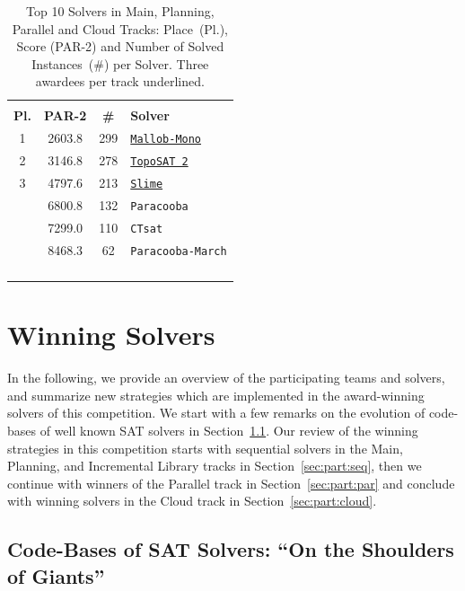 \documentclass{elsarticle}
\newcommand{\solver}[1]{\texttt{#1}}
\newcommand{\solbert}[1]{\underline{\solver{#1}}}
\begin{document}
\begin{table}
\begin{tabularx}{.5\linewidth}{cccX}
\arrayrulecolor{lightgray}
\multicolumn{4}{l}{\bf Cloud Track}\\
\bf Pl. & \bf PAR-2 & \bf \# & \bf Solver \\
\hline
 1 & 2603.8 & 299 & \solbert{Mallob-Mono} \\
 2 & 3146.8 & 278 & \solbert{TopoSAT 2} \\
 3 & 4797.6 & 213 & \solbert{Slime} \\
   & 6800.8 & 132 & \solver{Paracooba} \\
   & 7299.0 & 110 & \solver{CTsat} \\
   & 8468.3 & \phantom{0}62 & \solver{Paracooba-March} \\
\phantom{0} & \phantom{0} & \phantom{0} & \phantom{0}\\
\phantom{0} & \phantom{0} & \phantom{0} & \phantom{0}\\
\phantom{0} & \phantom{0} & \phantom{0} & \phantom{0}\\
\phantom{0} & \phantom{0} & \phantom{0} & \phantom{0}
\end{tabularx}
\caption{Top 10 Solvers in Main, Planning, Parallel and Cloud Tracks: Place~(Pl.), Score (PAR-2) and Number of Solved Instances~(\#) per Solver.
Three awardees per track underlined.}
\label{tab:results}
\end{table}


\section{Winning Solvers}
\label{sec:winners}

In the following, we provide an overview of the participating teams and solvers, 
and summarize new strategies which are implemented in the award-winning solvers of this competition. 
We start with a few remarks on the evolution of code-bases of well known SAT solvers in Section~\ref{sec:codebases}. 
Our review of the winning strategies in this competition starts with sequential solvers in the Main, Planning, and Incremental Library tracks in Section~\ref{sec:part:seq},
then we continue with winners of the Parallel track in Section~\ref{sec:part:par} and conclude with winning solvers in the Cloud track in Section~\ref{sec:part:cloud}. 


\subsection{Code-Bases of SAT Solvers: ``On the Shoulders of Giants''}
\label{sec:codebases}
\end{document}
